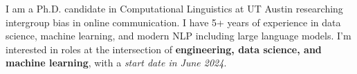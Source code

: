 I am a Ph.D. candidate in Computational Linguistics at UT Austin researching intergroup bias in online communication. I have 5+ years of experience in data science, machine learning, and modern NLP including large language models. I'm interested in roles at the intersection of \textbf{engineering, data science, and machine learning}, with a \emph{start date in June 2024}.

